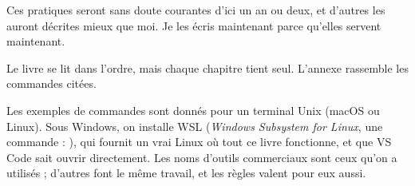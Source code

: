 Ces pratiques seront sans doute courantes d'ici un an ou deux, et d'autres les auront
décrites mieux que moi. Je les écris maintenant parce qu'elles servent maintenant.

Le livre se lit dans l'ordre, mais chaque chapitre tient seul. L'annexe rassemble les
commandes citées.

\begin{noteblock}
Les exemples de commandes sont donnés pour un terminal Unix (macOS ou Linux). Sous
Windows, on installe WSL (\emph{Windows Subsystem for Linux}, une commande :
), qui fournit un vrai Linux où tout ce livre fonctionne, et que VS Code
sait ouvrir directement. Les noms
d'outils commerciaux sont ceux qu'on a utilisés ; d'autres font le même travail, et les
règles valent pour eux aussi.
\end{noteblock}

